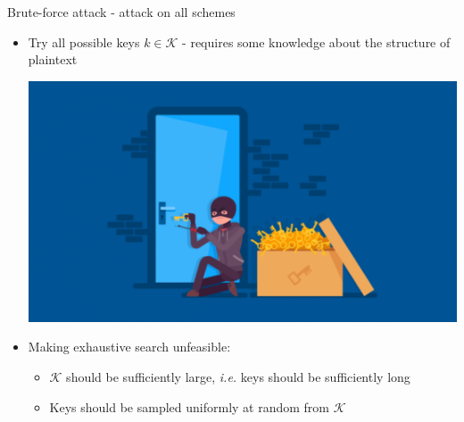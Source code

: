 \documentclass[aspectratio=169, lualatex, handout, 10pt,dvipsnames,svgnames]{beamer} %
\begin{document}
\begin{frame}{Brute-force attack - attack on all schemes}
  \begin{itemize}
  \item Try all possible keys $k\in\mathcal{K}$ - requires some knowledge about the structure of plaintext
    \begin{center}
      \includegraphics[scale=0.25]{Images/brute-force-attack.pdf}
    \end{center}
    \bigskip
    
  \item Making exhaustive search unfeasible:
    \begin{itemize}
    \item $\mathcal K$ should be sufficiently large, \emph{i.e.} keys
      should be sufficiently long
    \item Keys should be sampled uniformly at random from $\mathcal K$
  \end{itemize}

  \end{itemize}
\end{frame}
\end{document}
